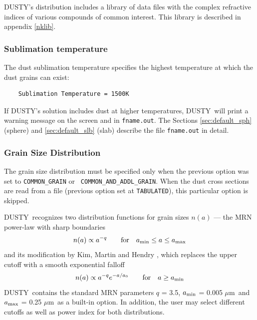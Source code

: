 \documentclass[11pt]{article}
\def\D    {{\sf DUSTY}}
\def\eq#1{\begin{equation} #1 \end{equation}}
\def\mic    {\hbox{$\mu$m}}
\begin{document}
\D's distribution includes a library of data files with the complex
refractive indices of various compounds of common interest. This
library is described in appendix \ref{nklib}.

\subsubsection{Sublimation temperature}
\label{sec:sub_temp}

The dust sublimation temperature specifies the highest temperature at
which the dust grains can exist:
\begin{verbatim}
    Sublimation Temperature = 1500K
\end{verbatim}
If \D's solution includes dust at higher temperatures, \D\ will print
a warning message on the screen and in {\tt fname.out}. The Sections
\ref{sec:default_sph} (sphere) and \ref{sec:default_slb} (slab)
describe the file {\tt fname.out} in detail.

\subsubsection{Grain Size Distribution}

The grain size distribution must be specified only when the previous
option was set to {\tt COMMON\_GRAIN} or {\tt
  COMMON\_AND\_ADDL\_GRAIN}.  When the dust cross sections are read
from a file (previous option set at {\tt TABULATED}), this particular
option is skipped.

\D\ recognizes two distribution functions for grain sizes $n(a)$ ---
the MRN \cite{MRN77} power-law with sharp boundaries \eq{ n(a) \propto
  a^{-q} \qquad \hbox{for} \quad a_{\rm min} \le a \le a_{\rm max} }
and its modification by Kim, Martin and Hendry \cite{KMH94}, which
replaces the upper cutoff with a smooth exponential falloff \eq{ n(a)
  \propto a^{-q} e^{-a/a_0} \qquad \hbox{for} \quad a \ge a_{\rm min}}
\D\ contains the standard MRN parameters $q$ = 3.5, $a_{\rm min}$ =
0.005 \mic\ and $a_{\rm max}$ = 0.25 \mic\ as a built-in option.  In
addition, the user may select different cutoffs as well as power index
for both distributions.
\end{document}
